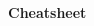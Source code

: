 \documentclass[a4paper]{article}
\title{\mytitle}
\author{Omgeta}
\date{AY 24/25 Sem 1}
\newcommand{\mytitle}{Cheatsheet}
\begin{document}
\begin{center}
     \Large{\textbf{\mytitle}}
\end{center}
\begin{multicols}{3}
\setlength{\premulticols}{1pt}
\setlength{\postmulticols}{1pt}
\setlength{\multicolsep}{1pt}
\setlength{\columnsep}{2pt}




\end{multicols}
\end{document}
